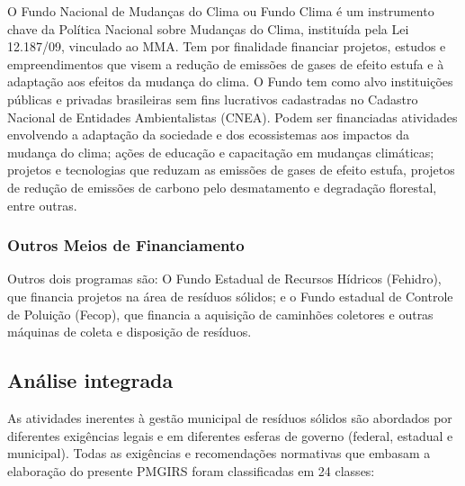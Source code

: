 	O Fundo Nacional de Mudanças do Clima ou Fundo Clima é um instrumento chave da Política Nacional sobre Mudanças do Clima, instituída pela  Lei 12.187/09, vinculado ao MMA. Tem por finalidade financiar projetos, estudos e empreendimentos que visem a redução de emissões de gases de efeito estufa e à adaptação aos efeitos da mudança do clima. 
	O Fundo tem como alvo instituições públicas e privadas brasileiras sem fins lucrativos cadastradas no Cadastro Nacional de Entidades Ambientalistas (CNEA). Podem ser financiadas atividades envolvendo a adaptação da sociedade e dos ecossistemas aos impactos da mudança do clima; ações de educação e capacitação em mudanças climáticas; projetos e tecnologias que reduzam as emissões de gases de efeito estufa, projetos de redução de emissões de carbono pelo desmatamento e degradação florestal, entre outras.
	
	
	\subsubsection{Outros Meios de Financiamento}
	
	Outros dois programas são: O Fundo Estadual de Recursos Hídricos (Fehidro), que financia projetos na área de resíduos sólidos; e o Fundo estadual de Controle de Poluição (Fecop), que financia a aquisição de caminhões coletores e outras máquinas de coleta e disposição de resíduos.
	
	\subsection{Análise integrada}
	
	As atividades inerentes à gestão municipal de resíduos sólidos são abordados por diferentes exigências legais e em diferentes esferas de governo (federal, estadual e municipal). Todas as exigências e recomendações normativas que embasam a elaboração do presente PMGIRS foram classificadas em 24 classes:
	
